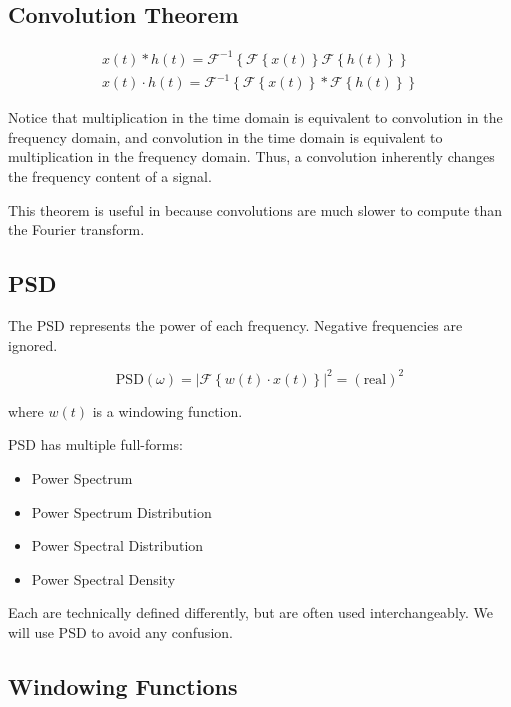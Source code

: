 \subsection{Convolution Theorem}

\begin{align*}
    x(t) \ast h(t) = \mathcal{F}^{-1}\left\{\mathcal{F}\left\{x(t)\right\} \mathcal{F}\left\{h(t)\right\}\right\} \\
    x(t) \cdot h(t) = \mathcal{F}^{-1}\left\{\mathcal{F}\left\{x(t)\right\} \ast \mathcal{F}\left\{h(t)\right\}\right\}
\end{align*}

Notice that multiplication in the time domain is equivalent to convolution in the frequency domain, and convolution in the time domain is equivalent to multiplication in the frequency domain. Thus, a convolution inherently changes the frequency content of a signal.

\vsp

This theorem is useful in because convolutions are much slower to compute than the Fourier transform.

\subsection{PSD}

The PSD represents the power of each frequency. Negative frequencies are ignored.

\begin{equation*}
    \text{PSD}(\omega) = \left| \mathcal{F}\left\{w(t) \cdot x(t)\right\} \right|^2 = (\text{real})^2
\end{equation*}

where $w(t)$ is a windowing function.

\vsp

PSD has multiple full-forms:

\begin{itemize}
    \item Power Spectrum
    \item Power Spectrum Distribution
    \item Power Spectral Distribution
    \item Power Spectral Density
\end{itemize}

Each are technically defined differently, but are often used interchangeably. We will use PSD to avoid any confusion.

\subsection{Windowing Functions}

